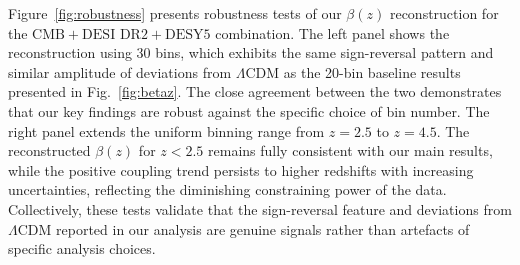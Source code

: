 \documentclass[a4paper,11pt]{article}
\begin{document}
{Figure~\ref{fig:robustness} presents robustness tests of our $\beta(z)$ reconstruction for the $\mathrm{CMB}+\mathrm{DESI\,\,DR2}+\mathrm{DESY5}$ combination. The left panel shows the reconstruction using 30 bins, which exhibits the same sign-reversal pattern and similar amplitude of deviations from $\Lambda$CDM as the 20-bin baseline results presented in Fig.~\ref{fig:betaz}. The close agreement between the two demonstrates that our key findings are robust against the specific choice of bin number. The right panel extends the uniform binning range from $z=2.5$ to $z=4.5$. The reconstructed $\beta(z)$ for $z<2.5$ remains fully consistent with our main results, while the positive coupling trend persists to higher redshifts with increasing uncertainties, reflecting the diminishing constraining power of the data. Collectively, these tests validate that the sign-reversal feature and deviations from $\Lambda$CDM reported in our analysis are genuine signals rather than artefacts of specific analysis choices.}



%


\end{document}
